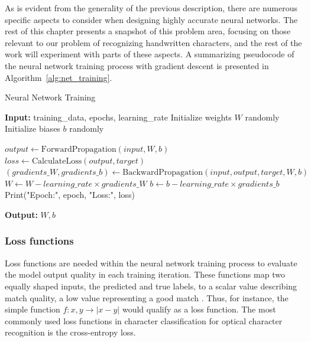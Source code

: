 \documentclass{article}
\begin{document}
As is evident from the generality of the previous description, there are numerous 
specific aspects to consider when designing highly accurate neural networks. The 
rest of this chapter presents a snapshot of this problem area, focusing on those 
relevant to our problem of recognizing handwritten characters, and the rest of the 
work will experiment with parts of these aspects. A summarizing pseudocode of the 
neural network training process with gradient descent is presented in Algorithm~\ref{alg:net_training}.

\begin{algorithm}
    \caption{Neural Network Training}
    \begin{algorithmic}[1]
        \State \textbf{Input:} training\_data, epochs, learning\_rate
        \State Initialize weights $W$ randomly
        \State Initialize biases $b$ randomly
        
                \State $output \gets \text{ForwardPropagation}(input, W, b)$
                \State $loss \gets \text{CalculateLoss}(output, target)$
                \State $(gradients\_W, gradients\_b) \gets \text{BackwardPropagation}(input, output, target, W, b)$
                \State $W \gets W - learning\_rate \times gradients\_W$
                \State $b \gets b - learning\_rate \times gradients\_b$
            \EndFor
            \State Print("Epoch:", epoch, "Loss:", loss)
        \EndFor
        
        \State \textbf{Output:} $W, b$  
    \end{algorithmic}
    \label{alg:net_training}
\end{algorithm}

\subsubsection{Loss functions}
\label{sect:loss_funcs}

Loss functions are needed within the neural network training process to evaluate the model output 
quality in each training iteration. These functions map two equally shaped inputs, the predicted 
and true labels, to a scalar value describing match quality, a low value representing a good match \cite{princebook}. 
Thus, for instance, the simple function $f: x,y \rightarrow |x-y|$  would qualify as a loss function.
The most commonly used loss functions in character classification for optical character recognition is 
the cross-entropy loss.
\end{document}
